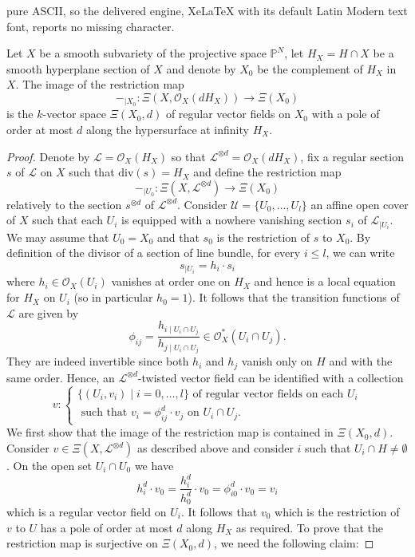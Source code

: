 \documentclass[10pt,a4paper]{amsart}
\renewcommand{\P}{\mathbb{P}}
\begin{document}
pure ASCII, so the delivered engine, XeLaTeX with its default Latin Modern text font, reports no missing character.
\begin{proposition} \label{presentation- twisted-vector field-hyperplanesection}
Let $X$ be a smooth  subvariety of the projective space $\P^N$, let $H_X = H \cap X$ be a smooth hyperplane section of $X$ and denote by $X_0$ be the complement of $H_X$ in $X$. The image of the restriction map 
$$-_{\mid X_0}: \Xi(X,\mathcal O_X(dH_X)) \rightarrow  \Xi(X_0) $$
is the $k$-vector space $\Xi(X_0,d)$ of regular vector fields on $X_0$ with a pole of order at most $d$ along the hypersurface at infinity $H_X$.  
\end{proposition} 

\begin{proof}
Denote by $\mathcal L = \mathcal O_X(H_X)$ so that $\mathcal L^{\otimes d} = \mathcal O_X(dH_X)$, fix a regular section $s$ of $\mathcal L$ on $X$ such that $\mathrm{div}(s) = H_X$ and define the restriction map
$$-_{\mid U_0}: \Xi(X,\mathcal L^{\otimes d}) \rightarrow \Xi(X_0)$$
relatively to the section $s^{\otimes d}$ of $\mathcal L^{\otimes d}$. Consider $\mathcal U = \lbrace U_0,\ldots, U_l \rbrace$ an affine open cover of $X$ such that each $U_i$ is equipped with a nowhere vanishing section $s_i$ of $\mathcal L_{\mid U_i}$. We may assume that $U_0 = X_0$ and that $s_0$ is the restriction of $s$ to $X_0$. By definition of the divisor of a section of line bundle, for every $i \leq l$, we can write 
$$ s_{\mid U_i} = h_i \cdot s_i$$ 
where $h_i \in \mathcal O_X(U_i)$ vanishes at order one on $H_X$ and hence is a local equation for $H_X$ on $U_i$ (so in particular $h_0 = 1$). It follows that the transition functions of $\mathcal L$ are given by 
$$\phi_{ij} = \frac {h_{i \mid U_i \cap U_j}} {h_{j \mid U_i \cap U_j}} \in \mathcal O^\ast _X(U_i \cap U_j).$$
They are indeed invertible since both $h_i$ and $h_j$ vanish only on $H$ and with the same order. Hence, an $\mathcal L^{\otimes d}$-twisted vector field can be identified with a collection 
$$ v:  \begin{cases} \lbrace (U_i,v_i) \mid i = 0,\ldots, l \rbrace \text{ of regular vector fields on each }U_i \\ 
\text{ such that } v_i = \phi_{ij}^d \cdot v_j \text{ on } U_i \cap U_j. \end{cases}
$$
We first show that the image of the restriction map is contained in $\Xi(X_0,d)$. Consider $v \in \Xi(X, \mathcal L^{\otimes d})$ as described above and consider $i$ such that $U_i \cap H \neq \emptyset$. On the open set $U_i \cap U_0$ we have 
$$h_i^d \cdot v_0 = \frac {h_i^d} {h_0^d} \cdot v_0 = \phi_{i0}^d \cdot v_0 = v_i$$
which is a regular vector field on $U_i$. It follows that $v_0$ which is the restriction of $v$ to $U$ has a pole of order at most $d$ along $H_X$ as required. To prove that the restriction map is surjective on $\Xi(X_0,d)$, we need the following claim: 


\end{proof}
\end{document}
